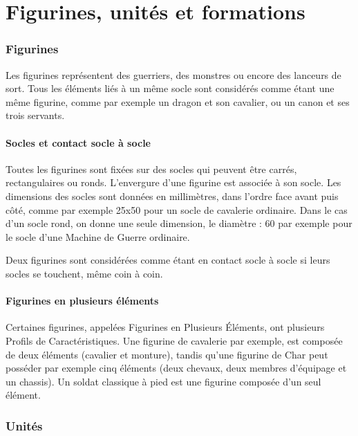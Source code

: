 
\part{Figurines, unités et formations}

\section{Figurines}

Les figurines représentent des guerriers, des monstres ou encore des lanceurs de sort. Tous les éléments liés à un même socle sont considérés comme étant une même figurine, comme par exemple un dragon et son cavalier, ou un canon et ses trois servants.

\subsection{Socles et contact socle à socle}

Toutes les figurines sont fixées sur des socles qui peuvent être carrés, rectangulaires ou ronds. L'envergure d'une figurine est associée à son socle. Les dimensions des socles sont données en millimètres, dans l'ordre face avant puis côté, comme par exemple \unit{25x50}{\milli\meter} pour un socle de cavalerie ordinaire. Dans le cas d'un socle rond, on donne une seule dimension, le diamètre : \unit{60}{\milli\meter} par exemple pour le socle d'une Machine de Guerre ordinaire.

Deux figurines sont considérées comme étant en contact socle à socle si leurs socles se touchent, même coin à coin.

\subsection{Figurines en plusieurs éléments}

Certaines figurines, appelées Figurines en Plusieurs Éléments, ont plusieurs Profils de Caractéristiques. Une figurine de cavalerie par exemple, est composée de deux éléments (cavalier et monture), tandis qu'une figurine de Char peut posséder par exemple cinq éléments (deux chevaux, deux membres d'équipage et un chassis). Un soldat classique à pied est une figurine composée d'un seul élément. 

\section{Unités}

